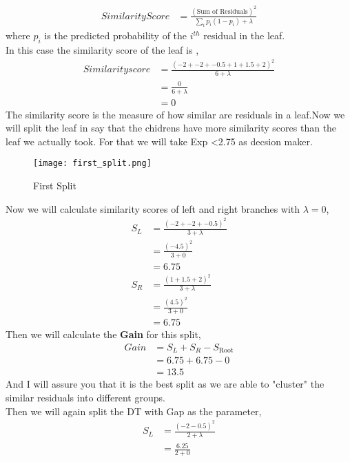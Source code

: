 \documentclass[journal,12pt,onecolumn]{IEEEtran}
\providecommand{\brak}[1]{\ensuremath{\left(#1\right)}}
\theoremstyle{remark}
\numberwithin{equation}{section}
\begin{document}
\begin{enumerate}
\begin{align}
			 Similarity Score &= \frac{\brak{\text{Sum of Residuals}}^2}{\sum_ip_i\brak{1-p_i} + \lambda}\label{classification}
	         \end{align}
			where $p_i$ is the predicted probability of the  $i^{th}$ residual in the leaf.\\
	In this case the similarity score of the leaf is ,
			\begin{align}
				Similarity score &= \frac{\brak{-2 + -2 + -0.5 + 1 + 1.5 + 2}^2}{6 + \lambda} \\
						 &= \frac{0}{6 + \lambda}\\
						 &= 0
			\end{align}
	The similarity score is the measure of how similar are residuals in a leaf.Now we will split the leaf in say that the chidrens have more similarity scores than the leaf we actually took. For that we will take Exp <2.75 as decsion maker. 
			\begin{figure}[ht!]
			 \centering
			 \texttt{[image: first\_split.png]}
			 \caption{First Split}
			 \label{1}
			\end{figure}
	Now we will calculate similarity scores of left and right branches with $\lambda = 0$,
			\begin{align}
			 S_{L} &= \frac{\brak{-2 + -2 + -0.5}^2}{3 + \lambda}\\
			       &= \frac{\brak{-4.5}^2}{3 + 0}\\
			       &= 6.75\\
			 S_{R} &= \frac{\brak{1 + 1.5 + 2}^2}{3 + \lambda}\\
			       &= \frac{\brak{4.5}^2}{3 + 0}\\
			       &= 6.75
		        \end{align}
           Then we will calculate the \textbf{Gain} for this split,
			\begin{align}
				Gain &= S_{L} + S_{R}- S_{\text{Root}} \\
				     &= 6.75 + 6.75 - 0 \\
				     &= 13.5
		        \end{align}
		And I will assure you that it is the best split as we are able to "cluster" the similar residuals into different groups.\\
		Then we will again split the DT with Gap as the parameter, 
			 \begin{align}
				 S_{L} &= \frac{\brak{-2-0.5}^2}{2 + \lambda}\\
				       &= \frac{6.25}{2 + 0}\\

\end{align}
\end{enumerate}
\end{document}
